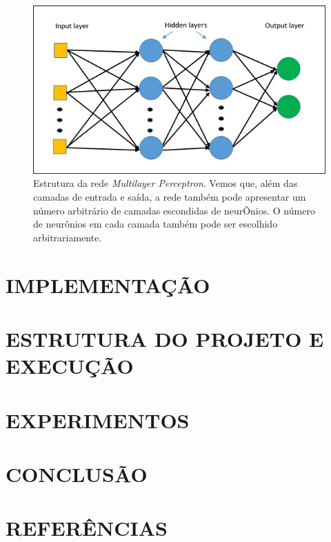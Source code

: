 \documentclass[12pt]{article}
\begin{document}
\begin{figure}[!htbp]
  \centering
  \includegraphics[width=1\textwidth]{mlp.jpg}
  \caption{Estrutura da rede \textit{Multilayer Perceptron}. Vemos
  que, além das camadas de entrada e saída, a rede também pode
  apresentar um número arbitrário de camadas escondidas de neurÕnios.
  O número de neurônios em cada camada também pode ser escolhido
  arbitrariamente.}
  \label{fig:mlp}
\end{figure}

\section{IMPLEMENTAÇÃO}



\section{ESTRUTURA DO PROJETO E EXECUÇÃO}



\section{EXPERIMENTOS}



\section{CONCLUSÃO}



\section{REFERÊNCIAS}





\end{document}
